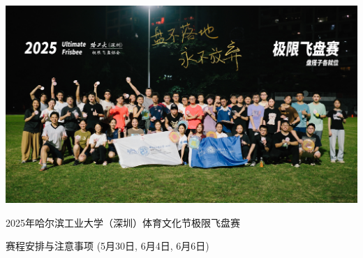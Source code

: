 \documentclass{ctexart}
\begin{document}
\begin{titlepage}
    \thispagestyle{empty} %
    \vspace*{-1.15in} %
    \noindent\hspace*{-1in}%
    \includegraphics[width=\paperwidth, height=0.4\paperheight, keepaspectratio]{大合照.jpg}%


    \vspace{-1pt} %
    \noindent\hspace*{-1in}%
    \colorbox{MyBannerTeal}{%
        \begin{minipage}[c][2em][c]{\dimexpr\paperwidth-2\fboxsep\relax} %
            \hspace{0pt} %
        \end{minipage}%
    }

    \begin{center}
        \vspace{4em} %
        {\LARGE 2025年哈尔滨工业大学（深圳）体育文化节极限飞盘赛\par} %
        
        \vspace{1.5em} %
        {\Large 赛程安排与注意事项 (5月30日, 6月4日, 6月6日)} \\[2em] %
        

\end{center}
\end{titlepage}
\end{document}
